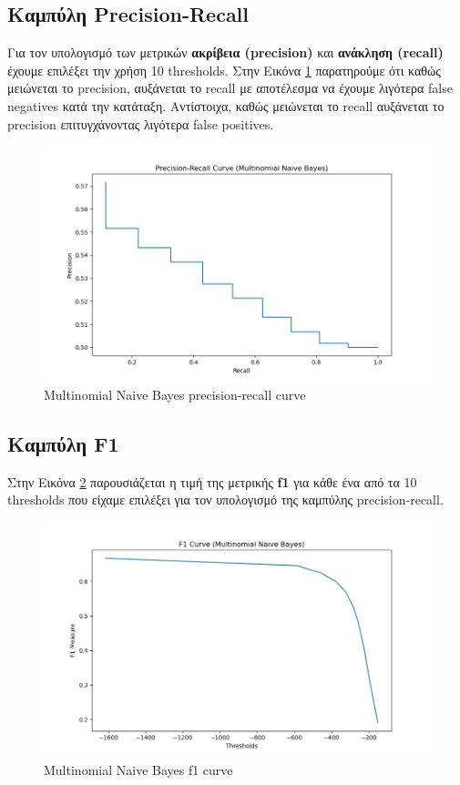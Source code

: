 \documentclass[12pt]{article}
\begin{document}
\subsection{Καμπύλη Precision-Recall}
Για τον υπολογισμό των μετρικών \textbf{ακρίβεια (precision)} και \textbf{ανάκληση (recall)} έχουμε επιλέξει την χρήση 10 thresholds. Στην Εικόνα \ref{fig:nb-precision-recall} παρατηρούμε ότι καθώς μειώνεται το precision, αυξάνεται το recall με αποτέλεσμα να έχουμε λιγότερα false negatives κατά την κατάταξη. Αντίστοιχα, καθώς μειώνεται το recall αυξάνεται το precision επιτυγχάνοντας λιγότερα false positives.
\begin{figure}[H]
    \centering
    \includegraphics[scale=.5]{images/nb-precision-recall}
    \caption{Multinomial Naive Bayes precision-recall curve}
    \label{fig:nb-precision-recall}
 \end{figure}

\subsection{Καμπύλη F1}
Στην Εικόνα \ref{fig:nb-f1} παρουσιάζεται η τιμή της μετρικής \textbf{f1} για κάθε ένα από τα 10 thresholds που είχαμε επιλέξει για τον υπολογισμό της καμπύλης precision-recall.
\begin{figure}[H]
    \centering
    \includegraphics[scale=.5]{images/nb-f1}
    \caption{Multinomial Naive Bayes f1 curve}
    \label{fig:nb-f1}
 \end{figure}
\end{document}
